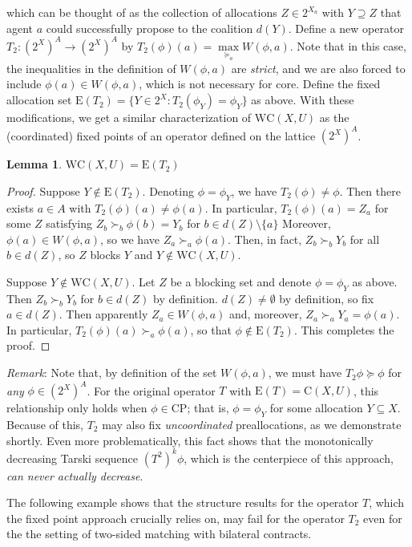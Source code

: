 \documentclass[11pt,reqno]{amsart}
\newtheorem{lemma}[thm]{Lemma}
\theoremstyle{definition}
\numberwithin{equation}{section}
\newcommand{\prf}{\begin{proof}}
\newcommand{\eprf}{\end{proof}}
\newcommand{\pre}{\phi}
\newcommand{\coordpre}{\mathrm{CP}}
\newcommand{\prealloc}{(2^X)^A}
\newcommand{\sub}{\subseteq}
\newcommand{\strcore}{\mathrm{C}(X,U)}
\newcommand{\core}{\mathrm{WC}(X,U)}
\newcommand{\fecon}{\mathrm{E}}
\newcommand{\suq}{\succeq}
\newcommand{\su}{\succ}
\newcommand{\optwo}{T_2}
\begin{document}
which can be thought of as the collection of allocations $Z \in 2^{X_a}$ with $Y \supseteq Z$ that agent $a$ could successfully propose to the coalition $d(Y)$.
Define a new operator $\optwo: \prealloc \to \prealloc$ by $\optwo (\pre) (a) = \max\limits_{\suq_a} W(\pre,a)$.
Note that in this case, the inequalities in the definition of $W(\pre,a)$ are \emph{strict}, and we are also forced to include $\pre(a) \in W(\pre,a)$, which is not necessary for core.
Define the fixed allocation set $\fecon(\optwo) = \{Y \in 2^X: \optwo(\pre_Y) = \pre_Y\}$ as above.
With these modifications, we get a similar characterization of $\core$ as the (coordinated) fixed points of an operator defined on the lattice $\prealloc$.
\begin{lemma} \label{lemma:core}
$\core = \fecon(\optwo)$
\end{lemma}
\prf
Suppose $Y \not \in \fecon(\optwo)$.
Denoting $\pre = \pre_Y$, we have $\optwo(\pre) \not = \pre$.
Then there exists $a \in A$ with $\optwo(\pre)(a) \not = \pre(a)$.
In particular, $\optwo(\pre)(a) = Z_a$ for some $Z$ satisfying $Z_b \su_b \pre(b) = Y_b$ for $b \in d(Z) \setminus \{a\}$
Moreover, $\pre(a) \in W(\pre,a)$, so we have $Z_a \su_a \pre(a)$.
Then, in fact, $Z_b \su_b Y_b$ for all $b \in d(Z)$, so $Z$ blocks $Y$ and $Y \not \in \core$.

Suppose $Y \not \in \core$. 
Let $Z$ be a blocking set and denote $\pre = \pre_Y$ as above.
Then $Z_b \su_b Y_b$ for $b \in d(Z)$ by definition.
$d(Z) \not = \emptyset$ by definition, so fix $a \in d(Z)$.
Then apparently $Z_a \in W(\pre,a)$ and, moreover, $Z_a \su_a Y_a = \pre(a)$.
In particular, $\optwo(\pre)(a) \su_a \pre(a)$, so that $\pre \not \in \fecon(\optwo)$.
This completes the proof.
\eprf

\emph{Remark}: Note that, by definition of the set $W(\pre,a)$, we must have $\optwo \pre \suq \pre$ for \emph{any} $\pre \in \prealloc$.
For the original operator $T$ with $\fecon(T) = \strcore$, this relationship only holds when $\pre \in \coordpre$; that is, $\pre = \pre_Y$ for some allocation $Y \sub X$.
Because of this, $\optwo$ may also fix \emph{uncoordinated} preallocations, as we demonstrate shortly.
Even more problematically, this fact shows that the monotonically decreasing Tarski sequence $(T^2)^k \pre$, which is the centerpiece of this approach, \emph{can never actually decrease}.

The following example shows that the structure results for the operator $T$, which the fixed point approach crucially relies on, may fail for the operator $\optwo$ even for the the setting of two-sided matching with bilateral contracts.
\end{document}
